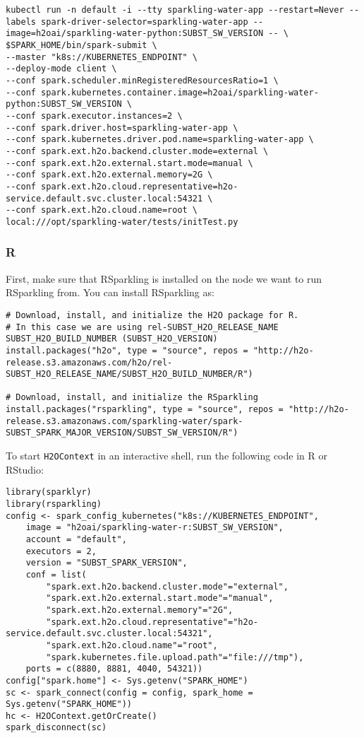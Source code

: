\begin{lstlisting}[style=Bash]
kubectl run -n default -i --tty sparkling-water-app --restart=Never --labels spark-driver-selector=sparkling-water-app --image=h2oai/sparkling-water-python:SUBST_SW_VERSION -- \
$SPARK_HOME/bin/spark-submit \
--master "k8s://KUBERNETES_ENDPOINT" \
--deploy-mode client \
--conf spark.scheduler.minRegisteredResourcesRatio=1 \
--conf spark.kubernetes.container.image=h2oai/sparkling-water-python:SUBST_SW_VERSION \
--conf spark.executor.instances=2 \
--conf spark.driver.host=sparkling-water-app \
--conf spark.kubernetes.driver.pod.name=sparkling-water-app \
--conf spark.ext.h2o.backend.cluster.mode=external \
--conf spark.ext.h2o.external.start.mode=manual \
--conf spark.ext.h2o.external.memory=2G \
--conf spark.ext.h2o.cloud.representative=h2o-service.default.svc.cluster.local:54321 \
--conf spark.ext.h2o.cloud.name=root \
local:///opt/sparkling-water/tests/initTest.py
\end{lstlisting}

\subsubsection{R}

First, make sure that RSparkling is installed on the node we want to run RSparkling from.
You can install RSparkling as:

\begin{lstlisting}[style=R]
# Download, install, and initialize the H2O package for R.
# In this case we are using rel-SUBST_H2O_RELEASE_NAME SUBST_H2O_BUILD_NUMBER (SUBST_H2O_VERSION)
install.packages("h2o", type = "source", repos = "http://h2o-release.s3.amazonaws.com/h2o/rel-SUBST_H2O_RELEASE_NAME/SUBST_H2O_BUILD_NUMBER/R")

# Download, install, and initialize the RSparkling
install.packages("rsparkling", type = "source", repos = "http://h2o-release.s3.amazonaws.com/sparkling-water/spark-SUBST_SPARK_MAJOR_VERSION/SUBST_SW_VERSION/R")
\end{lstlisting}

To start \texttt{H2OContext} in an interactive shell, run the following code in R or RStudio:

\begin{lstlisting}[style=R]
library(sparklyr)
library(rsparkling)
config <- spark_config_kubernetes("k8s://KUBERNETES_ENDPOINT",
    image = "h2oai/sparkling-water-r:SUBST_SW_VERSION",
    account = "default",
    executors = 2,
    version = "SUBST_SPARK_VERSION",
    conf = list(
        "spark.ext.h2o.backend.cluster.mode"="external",
        "spark.ext.h2o.external.start.mode"="manual",
        "spark.ext.h2o.external.memory"="2G",
        "spark.ext.h2o.cloud.representative"="h2o-service.default.svc.cluster.local:54321",
        "spark.ext.h2o.cloud.name"="root",
        "spark.kubernetes.file.upload.path"="file:///tmp"),
    ports = c(8880, 8881, 4040, 54321))
config["spark.home"] <- Sys.getenv("SPARK_HOME")
sc <- spark_connect(config = config, spark_home = Sys.getenv("SPARK_HOME"))
hc <- H2OContext.getOrCreate()
spark_disconnect(sc)
\end{lstlisting}


